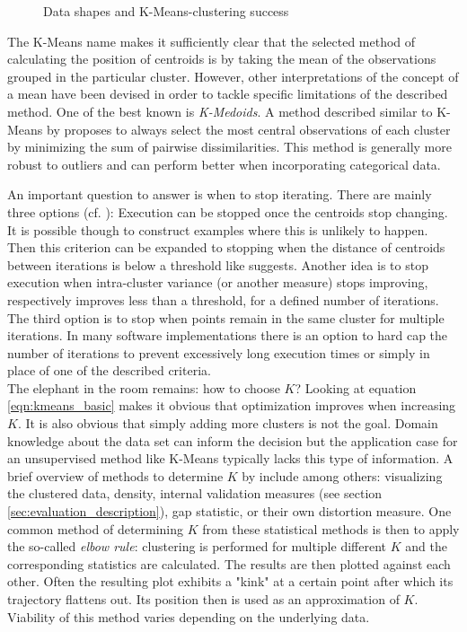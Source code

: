 \begin{figure}[h]
\caption{Data shapes and K-Means-clustering success}
\label{img:k_means_cluster_success}
\end{figure}

 The K-Means name makes it sufficiently clear that the selected method of calculating the position of centroids is by taking the mean of the observations grouped in the particular cluster. However, other interpretations of the concept of a mean have been devised in order to tackle specific limitations of the described method. One of the best known is \textit{K-Medoids}. A method described similar to K-Means by \cite{park2009simple} proposes to always select the most central observations of each cluster by minimizing the sum of pairwise dissimilarities. This method is generally more robust to outliers and can perform better when incorporating categorical data.

 An important question to answer is when to stop iterating. There are mainly three options (cf. \cite{cleuziou2008extended}): Execution can be stopped once the centroids stop changing. It is possible though to construct examples where this is unlikely to happen. Then this criterion can be expanded to stopping when the distance of centroids between iterations is below a threshold like \cite{lloyd1982least} suggests. Another idea is to stop execution when intra-cluster variance (or another measure) stops improving, respectively improves less than a threshold, for a defined number of iterations. The third option is to stop when points remain in the same cluster for multiple iterations. In many software implementations there is an option to hard cap the number of iterations to prevent excessively long execution times or simply in place of one of the described criteria.\\

The elephant in the room remains: how to choose $K$? Looking at equation \ref{eqn:kmeans_basic} makes it obvious that optimization improves when increasing $K$. It is also obvious that simply adding more clusters is not the goal. Domain knowledge about the data set can inform the decision but the application case for an unsupervised method like K-Means typically lacks this type of information. A brief overview of methods to determine $K$ by \cite{pham2005selection, yuan2019research} include among others: visualizing the clustered data, density, internal validation measures (see section \ref{sec:evaluation_description}), gap statistic, or their own distortion measure. One common method of determining $K$ from these statistical methods is then to apply the so-called \textit{elbow rule}: clustering is performed for multiple different $K$ and the corresponding statistics are calculated. The results are then plotted against each other. Often the resulting plot exhibits a "kink" at a certain point after which its trajectory flattens out. Its position then is used as an approximation of $K$. Viability of this method varies depending on the underlying data.